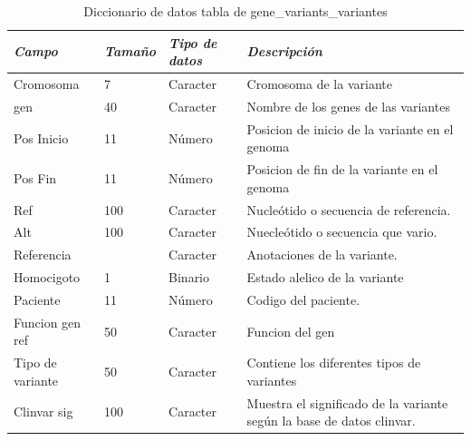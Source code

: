 \begin{table}[h!]
	\begin{tabular}{|l|l|l|p{7cm}|}
		\hline
		\textit{\textbf{Campo}} & \textit{\textbf{Tamaño}} & \textit{\textbf{Tipo de datos}} & \textit{\textbf{Descripción}}                                         \\ \hline
		Cromosoma               & 7                        & Caracter                        & Cromosoma de la variante                                              \\ \hline
		gen                     & 40                       & Caracter                        & Nombre de los genes de las variantes                                  \\ \hline
		Pos Inicio              & 11                       & Número                          & Posicion de inicio de la variante en el genoma                        \\ \hline
		Pos Fin                 & 11                       & Número                          & Posicion de fin de la variante en el genoma                           \\ \hline
		Ref                     & 100                      & Caracter                        & Nucleótido o secuencia de referencia.                                 \\ \hline
		Alt                     & 100                      & Caracter                        & Nuecleótido o secuencia que vario.                                    \\ \hline
		Referencia              &                          & Caracter                        & Anotaciones de la variante.                                           \\ \hline
		Homocigoto              & 1                        & Binario                         & Estado alelico de la variante                                         \\ \hline
		Paciente                & 11                       & Número                          & Codigo del paciente.                                                  \\ \hline
		Funcion gen ref         & 50                       & Caracter                        & Funcion del gen                                                       \\ \hline
		Tipo de variante        & 50                       & Caracter                        & Contiene los diferentes tipos de variantes                            \\ \hline
		Clinvar sig             & 100                      & Caracter                        & Muestra el significado de la variante según la base de datos clinvar. \\ \hline
	\end{tabular}
\caption{Diccionario de datos tabla de gene\_variants\_variantes}
\label{tabla:datos1}
\end{table}


